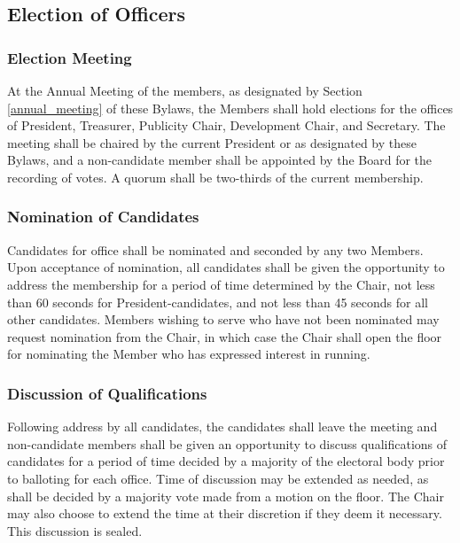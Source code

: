 \documentclass{article}
\begin{document}
\subsection{Election of Officers} \label{elections}

\subsubsection{Election Meeting}

At the Annual Meeting of the members, as designated by Section
\ref{annual_meeting} of these Bylaws, the Members shall hold elections for the
offices of President, Treasurer, Publicity Chair, Development Chair, and
Secretary. The meeting shall be chaired by the current President or as
designated by these Bylaws, and a non-candidate member shall be appointed by the
Board for the recording of votes. A quorum shall be two-thirds of the
current membership.

\subsubsection{Nomination of Candidates}

Candidates for office shall be nominated and seconded by any two Members.  Upon
acceptance of nomination, all candidates shall be given the opportunity to
address the membership for a period of time determined by the Chair, not less
than 60 seconds for President-candidates, and not less than 45 seconds for all
other candidates. Members wishing to serve who have not been nominated may
request nomination from the Chair, in which case the Chair shall open the floor
for nominating the Member who has expressed interest in running.

\subsubsection{Discussion of Qualifications}

Following address by all candidates, the candidates shall leave the meeting and
non-candidate members shall be given an opportunity to discuss qualifications of
candidates for a period of time decided by a majority of the electoral body
prior to balloting for each office. Time of discussion may be extended as
needed, as shall be decided by a majority vote made from a motion on the
floor. The Chair may also choose to extend the time at their discretion if they
deem it necessary. This discussion is sealed.
\end{document}
